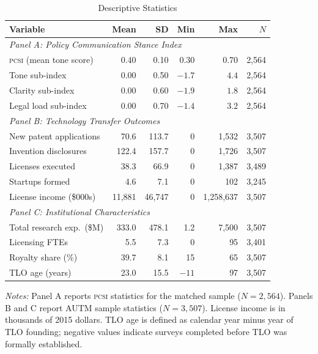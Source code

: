\documentclass[12pt]{article}
\newcommand{\PCSI}{\textsc{pcsi}}
\begin{document}
\begin{table}[htbp]
\centering
\caption{Descriptive Statistics}
\label{tab:desc}
\begin{threeparttable}
\begin{tabular}{lrrrrr}
\toprule
Variable & Mean & SD & Min & Max & $N$ \\
\midrule
\multicolumn{6}{l}{\textit{Panel A: Policy Communication Stance Index}} \\
\PCSI{} (mean tone score) & 0.40 & 0.10 & 0.30 & 0.70 & 2,564 \\
Tone sub-index & 0.00 & 0.50 & $-1.7$ & $4.4$ & 2,564 \\
Clarity sub-index & 0.00 & 0.60 & $-1.9$ & $1.8$ & 2,564 \\
Legal load sub-index & 0.00 & 0.70 & $-1.4$ & $3.2$ & 2,564 \\
\midrule
\multicolumn{6}{l}{\textit{Panel B: Technology Transfer Outcomes}} \\
New patent applications & 70.6 & 113.7 & 0 & 1,532 & 3,507 \\
Invention disclosures & 122.4 & 157.7 & 0 & 1,726 & 3,507 \\
Licenses executed & 38.3 & 66.9 & 0 & 1,387 & 3,489 \\
Startups formed & 4.6 & 7.1 & 0 & 102 & 3,245 \\
License income (\$000s) & 11,881 & 46,747 & 0 & 1,258,637 & 3,507 \\
\midrule
\multicolumn{6}{l}{\textit{Panel C: Institutional Characteristics}} \\
Total research exp.\ (\$M) & 333.0 & 478.1 & 1.2 & 7,500 & 3,507 \\
Licensing FTEs & 5.5 & 7.3 & 0 & 95 & 3,401 \\
Royalty share (\%) & 39.7 & 8.1 & 15 & 65 & 3,507 \\
TLO age (years) & 23.0 & 15.5 & $-11$ & 97 & 3,507 \\
\bottomrule
\end{tabular}
\begin{tablenotes}
\small
\item \textit{Notes:} Panel A reports \PCSI{} statistics for the matched sample
($N=2{,}564$). Panels B and C report AUTM sample statistics ($N=3{,}507$).
License income is in thousands of 2015 dollars. TLO age is defined as calendar year
minus year of TLO founding; negative values indicate surveys completed before TLO
was formally established.
\end{tablenotes}
\end{threeparttable}
\end{table}
\end{document}
